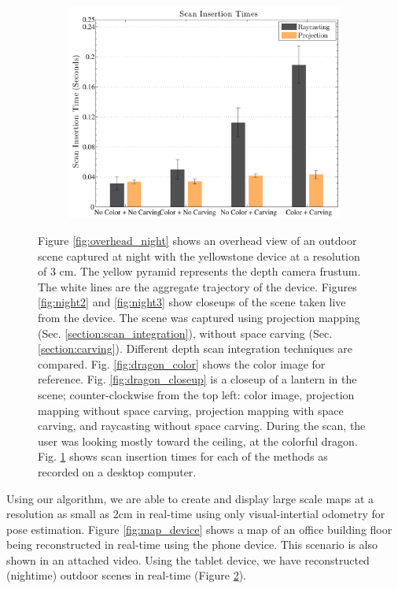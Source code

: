 \documentclass[10pt,twocolumn,letterpaper]{article}
\begin{document}
\begin{figure}
\begin{subfigure}{0.35\linewidth}
\includegraphics[width=1.0\textwidth]{img/timing_data.pdf}
		 \caption{}
		 \label{fig:timing}
	 \end{subfigure} 
	 \caption{Figure \ref{fig:overhead_night} shows an overhead view of
	 an outdoor scene captured at night with the yellowstone device at a
	 resolution of 3 cm. The yellow pyramid represents the depth camera frustum. The white
	 lines are the aggregate trajectory of the device. Figures \ref{fig:night2}
	 and \ref{fig:night3} show closeups of the scene taken live from the device.
	 The scene was captured using projection mapping (Sec.
	 \ref{section:scan_integration}), without space
	 carving (Sec. \ref{section:carving}). Different depth scan integration techniques are compared. Fig.
	 \ref{fig:dragon_color} shows the color image for reference.  Fig.
	 \ref{fig:dragon_closeup} is a closeup of a lantern in the scene; 
	 counter-clockwise from the top left: color image, projection mapping without
	 space carving, projection mapping with space carving, and raycasting without
	 space carving. During the scan, the user was looking mostly toward the
	 ceiling, at the colorful dragon. Fig. \ref{fig:timing} shows
      scan insertion times for each of the methods as recorded on a desktop
      computer.}
	 \label{fig:outside}
 \end{figure} 

Using our algorithm, we are able to create and display large scale maps at a
resolution as small as 2cm in real-time using only visual-intertial odometry for
pose estimation. Figure \ref{fig:map_device} shows a map of an office building floor
being reconstructed in real-time using the phone device. This scenario is also
shown in an attached video. Using the tablet device, we have reconstructed
(nightime) outdoor scenes in real-time (Figure \ref{fig:outside}).
\end{document}
